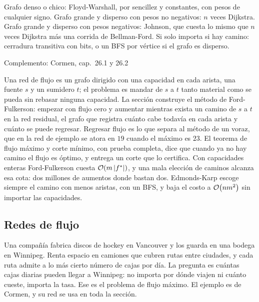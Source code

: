 \documentclass[11pt,letterpaper]{article}
\begin{document}
\begin{idea}
  Grafo denso o chico: Floyd-Warshall, por sencillez y constantes, con
  pesos de cualquier signo. Grafo grande y disperso con pesos no
  negativos: $n$ veces Dijkstra. Grafo grande y disperso con pesos
  negativos: Johnson, que cuesta lo mismo que $n$ veces Dijkstra más
  una corrida de Bellman-Ford. Si solo importa si hay camino:
  cerradura transitiva con bits, o un BFS por vértice si el grafo es
  disperso.
\end{idea}

\newpage


  {Complemento: Cormen, cap.\ 26.1 y 26.2}
\label{sec:flujo}

\begin{quick_sum}
  Una red de flujo es un grafo dirigido con una capacidad en cada
  arista, una fuente $s$ y un sumidero $t$; el problema es mandar de
  $s$ a $t$ tanto material como se pueda sin rebasar ninguna
  capacidad. La sección construye el método de Ford-Fulkerson:
  empezar con flujo cero y aumentar mientras exista un camino de $s$ a
  $t$ en la red residual, el grafo que registra cuánto cabe todavía en
  cada arista y cuánto se puede regresar. Regresar flujo es lo que
  separa al método de un voraz, que en la red de ejemplo se atora en
  $19$ cuando el máximo es $23$. El teorema de flujo máximo y corte
  mínimo, con prueba completa, dice que cuando ya no hay camino el
  flujo es óptimo, y entrega un corte que lo certifica. Con
  capacidades enteras Ford-Fulkerson cuesta $\mathcal{O}\!\left(m \left\lvert f^* \right\rvert\right)$, y una
  mala elección de caminos alcanza esa cota: dos millones de aumentos
  donde bastan dos. Edmonds-Karp escoge siempre el camino con menos
  aristas, con un BFS, y baja el costo a $\mathcal{O}\!\left(n m^2\right)$ sin importar
  las capacidades.
\end{quick_sum}

\subsection*{Redes de flujo}

Una compañía fabrica discos de hockey en Vancouver y los guarda en una
bodega en Winnipeg. Renta espacio en camiones que cubren rutas entre
ciudades, y cada ruta admite a lo más cierto número de cajas por día.
La pregunta es cuántas cajas diarias pueden llegar a Winnipeg: no
importa por dónde viajen ni cuánto cueste, importa la tasa. Ese es el
problema de flujo máximo. El ejemplo es de Cormen, y su red se usa en
toda la sección.
\end{document}
